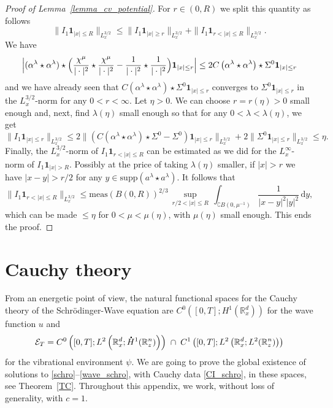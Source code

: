 \documentclass[10pt]{amsart}
\theoremstyle{definition}
\newcommand*{\overbigdot}[1]{%
\accentset{\mbox{\large\bfseries .}}{#1}}
\newenvironment{ProofOf}[1]{\begin{proof}[Proof of #1]}{\end{proof}}
\newcommand{\R}{\mathbb{R}}
\newcommand{\ud}{\, {\mathrm{d}}}
\begin{document}
\begin{ProofOf}{Lemma~\ref{lemma_cv_potential}}
For $r\in(0,R)$ we split this quantity as follows
\[
\|I_{1}\mathbf{1}_{|x|\leq R}\|_{L_{x}^{3/2}}\leq\|I_{1}\mathbf{1}_{|x|\geq r}\|_{L_{x}^{3/2}}+\|I_{1}\mathbf{1}_{r<|x|\leq R}\|_{L_{x}^{3/2}}.
\]
We have
\[
\Bigl |(\alpha^{\lambda}\star\alpha^{\lambda})\star \Bigl(\frac{\chi^{\mu}}{|\cdot|^{2}}\star\frac{\chi^{\mu}}{|\cdot|^{2}}-\frac{1}{|\cdot|^{2}}\star\frac{1}{|\cdot|^{2}} \Bigr)\mathbf{1}_{|x|\leq r} \Bigr|\leq 2C\left(\alpha^{\lambda}\star\alpha^{\lambda}\right)\star\Sigma^{0}\mathbf{1}_{|x|\leq r}
\]
and we have already seen that $C(\alpha^{\lambda}\star\alpha^{\lambda})\star\Sigma^{0}\mathbf{1}_{|x|\leq r}$ converges to $\Sigma^{0}\mathbf{1}_{|x|\leq r}$ in the $L_{x}^{3/2}$-norm for any $0<r<\infty$.
Let $\eta>0$. We can choose $r=r(\eta)>0$ small enough and, next, find $\lambda(\eta)$ small enough so that for any $0<\lambda<\lambda(\eta)$, we get
\[
\|I_{1}\mathbf{1}_{|x|\leq r}\|_{L_{x}^{3/2}}\leq 2\|(C(\alpha^{\lambda}\star\alpha^{\lambda})\star\Sigma^{0}-\Sigma^{0})\mathbf{1}_{|x|\leq r}\|_{L_{x}^{3/2}}+2\|\Sigma^{0}\mathbf{1}_{|x|\leq r}\|_{L_{x}^{3/2}}
\leq \eta.
\]
Finally, the $L_{x}^{3/2}$-norm of $I_{1}\mathbf{1}_{r<|x|\leq R}$ can be estimated as we did for the $L_{x}^{\infty}$-norm of $I_{1}\mathbf{1}_{|x|>R}$.
Possibly at the price of taking $\lambda(\eta)$ smaller,
if $|x|>r$ we have $|x-y|>r/2$ for any $y\in \mathrm{supp}(a^\lambda\star a^\lambda)$. It follows that
\[
\|I_{1}\mathbf{1}_{r<|x|\leq R}\|_{L_{x}^{3/2}}\leq\mathrm{meas}\left(B(0,R)\right)^{2/3}\,\underset{r/2<|x|\leq R}{\sup}\,\int_{\complement B(0,\mu^{-1})}\frac{1}{|x-y|^{2}|y|^{2}}\ud y,
\]
which can be made $\leq \eta$ for $0<\mu<\mu(\eta)$, with $\mu(\eta)$ small enough.
This ends the proof.
\end{ProofOf}

\appendix
\section{Cauchy theory}\label{CauchyTheory}

From an energetic point of view, the natural functional spaces for the Cauchy theory of the Schrödinger-Wave equation are $C^{0}([0,T];H^{1}(\R_{x}^{d}))$ for the wave function $u$ and
\[
\mathcal{E}_{T}=C^{0}\left([0,T];L^{2}\left(\R_{x}^{d};\overbigdot{H}^{1}(\R_{z}^{n})\right)\right)\;\cap\;C^{1}\left([0,T];L^{2}\left(\R_{x}^{d};L^{2}(\R_{z}^{n})\right)\right)
\]
for the vibrational environment $\psi$.
We are going to prove the global existence of solutions to \eqref{schro}--\eqref{wave_schro}, with Cauchy data \eqref{CI_schro},
in these spaces, see Theorem~\ref{TC}.
Throughout this appendix, we work, without loss of generality, with $c=1$.
\end{document}
